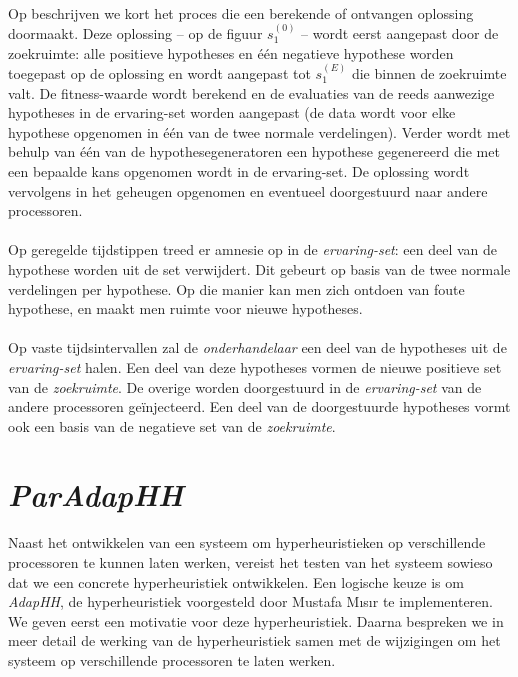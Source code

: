 \paragraph{}
Op  beschrijven we kort het proces die een berekende of ontvangen oplossing doormaakt. Deze oplossing -- op de figuur $s_1^{(0)}$ -- wordt eerst aangepast door de zoekruimte: alle positieve hypotheses en \'e\'en negatieve hypothese worden toegepast op de oplossing en wordt aangepast tot $s_1^{(E)}$ die binnen de zoekruimte valt. De fitness-waarde wordt berekend en de evaluaties van de reeds aanwezige hypotheses in de ervaring-set worden aangepast (de data wordt voor elke hypothese opgenomen in \'e\'en van de twee normale verdelingen). Verder wordt met behulp van \'e\'en van de hypothesegeneratoren  een hypothese gegenereerd die met een bepaalde kans opgenomen wordt in de ervaring-set. De oplossing wordt vervolgens in het geheugen opgenomen en eventueel doorgestuurd naar andere processoren.

\paragraph{}
Op geregelde tijdstippen treed er amnesie op in de \emph{ervaring-set}: een deel van de hypothese worden uit de set verwijdert. Dit gebeurt op basis van de twee normale verdelingen per hypothese. Op die manier kan men zich ontdoen van foute hypothese, en maakt men ruimte voor nieuwe hypotheses.

\paragraph{}
Op vaste tijdsintervallen zal de \emph{onderhandelaar} een deel van de hypotheses uit de \emph{ervaring-set} halen. Een deel van deze hypotheses vormen de nieuwe positieve set van de \emph{zoekruimte}. De overige worden doorgestuurd in de \emph{ervaring-set} van de andere processoren ge\"injecteerd. Een deel van de doorgestuurde hypotheses vormt ook een basis van de negatieve set van de \emph{zoekruimte}.

\section{\emph{ParAdapHH}}

Naast het ontwikkelen van een systeem om hyperheuristieken op verschillende processoren te kunnen laten werken, vereist het testen van het systeem sowieso dat we een concrete hyperheuristiek ontwikkelen. Een logische keuze is om \emph{AdapHH}, de hyperheuristiek voorgesteld door Mustafa M\i{}s\i{}r te implementeren. We geven eerst een motivatie voor deze hyperheuristiek. Daarna bespreken we in meer detail de werking van de hyperheuristiek samen met de wijzigingen om het systeem op verschillende processoren te laten werken.

